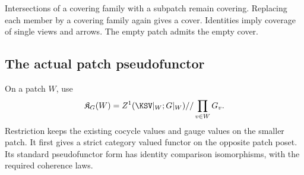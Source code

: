 Intersections of a covering family with a subpatch remain covering. Replacing each member by a covering family again gives a cover. Identities imply coverage of single views and arrows. The empty patch admits the empty cover.

\subsection{The actual patch pseudofunctor}
On a patch \(W\), use
\[
 \mathfrak K_G(W)=Z^1(\KSV|_W;G|_W)//\prod_{v\in W}G_v.
\]
Restriction keeps the existing cocycle values and gauge values on the smaller patch. It first gives a strict category valued functor on the opposite patch poset. Its standard pseudofunctor form has identity comparison isomorphisms, with the required coherence laws.

